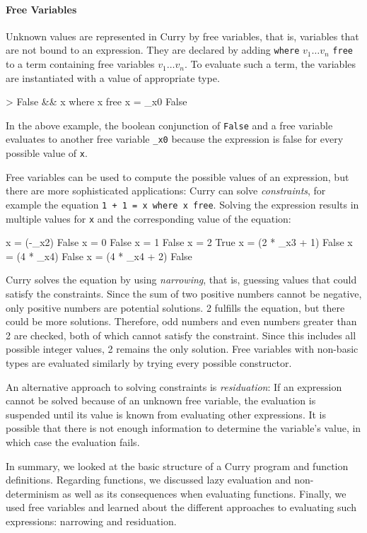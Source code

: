 \documentclass[paper = a4, fleqn, abstract=on, twoside]{scrreprt}
\begin{document}
\paragraph{Free Variables}
Unknown values are represented in Curry by free variables, that is, variables that are not bound to an expression. They are declared by adding \texttt{where} $v_1\dots v_n$ \texttt{free} to a term containing free variables $v_1 \dots v_n$. To evaluate such a term, the variables are instantiated with a value of appropriate type.
\begin{haskellcode}
> False && x where x free
{x = _x0} False
\end{haskellcode}
In the above example, the boolean conjunction of \texttt{False} and a free variable evaluates to another free variable \texttt{\_x0} because the expression is false for every possible value of \texttt{x}.
\par
Free variables can be used to compute the possible values of an expression, but there are more sophisticated applications: Curry can solve \textit{constraints}, for example the equation \texttt{1 + 1 = x where x free}. Solving the expression results in multiple values for \texttt{x} and the corresponding value of the equation:
\begin{haskellcode}
{x = (-_x2)} False
{x = 0} False
{x = 1} False
{x = 2} True
{x = (2 * _x3 + 1)} False
{x = (4 * _x4)} False
{x = (4 * _x4 + 2)} False
\end{haskellcode}
Curry solves the equation by using \textit{narrowing}, that is, guessing values that could satisfy the constraints. Since the sum of two positive numbers cannot be negative, only positive numbers are potential solutions. 2 fulfills the equation, but there could be more solutions. Therefore, odd numbers and even numbers greater than 2 are checked, both of which cannot satisfy the constraint. Since this includes all possible integer values, 2 remains the only solution. Free variables with non-basic types are evaluated similarly by trying every possible constructor.
\par 
An alternative approach to solving constraints is \textit{residuation}: If an expression cannot be solved because of an unknown free variable, the evaluation is suspended until its value is known from evaluating other expressions. It is possible that there is not enough information to determine the variable's value, in which case the evaluation fails. \\
\par \noindent
In summary, we looked at the basic structure of a Curry program and function definitions. Regarding functions, we discussed lazy evaluation and non-determinism as well as its consequences when evaluating functions. Finally, we used free variables and learned about the different approaches to evaluating such expressions: narrowing and residuation.
\end{document}
